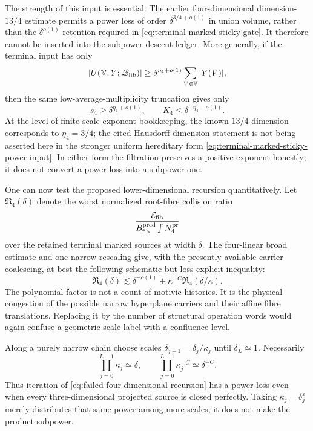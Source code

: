 \documentclass[11pt]{article}
\begin{document}
The strength of this input is essential.  The earlier four-dimensional
dimension-\(13/4\) estimate \cite{ChoudhuriSticky4D} permits a power loss
of order \(\delta^{3/4+o(1)}\) in union volume, rather than the
\(\delta^{o(1)}\) retention required in
\eqref{eq:terminal-marked-sticky-gate}.  It therefore cannot be inserted
into the subpower descent ledger.
More generally, if the terminal input has only
\begin{equation}\label{eq:terminal-marked-sticky-power-input}
 |U(\mathbb V,Y;\mathscr Q_{\rm fib})|
 \ge\delta^{\eta_4+o(1)}
       \sum_{V\in\mathbb V}|Y(V)|,
\end{equation}
then the same low-average-multiplicity truncation gives only
\begin{equation}\label{eq:terminal-marked-sticky-power-output}
 s_4\ge\delta^{\eta_4+o(1)},
 \qquad
 K_4\le\delta^{-\eta_4-o(1)}.
\end{equation}
At the level of finite-scale exponent bookkeeping, the known \(13/4\)
dimension corresponds to \(\eta_4=3/4\); the cited Hausdorff-dimension
statement is not being asserted here in the stronger uniform hereditary form
\eqref{eq:terminal-marked-sticky-power-input}.  In either form the
filtration preserves a positive exponent honestly; it does not convert a
power loss into a subpower one.

One can now test the proposed lower-dimensional recursion quantitatively.
Let \(\mathfrak R_4(\delta)\) denote the worst normalized root-fibre
collision ratio
\[
 \frac{\mathcal E_{\rm fib}}
      {B_{\rm fib}^{\rm pred}\int N_4^{\rm pr}}
\]
over the retained terminal marked sources at width \(\delta\).  The
four-linear broad estimate and one narrow rescaling give, with the presently
available carrier coalescing, at best the following schematic but
loss-explicit inequality:
\begin{equation}\label{eq:failed-four-dimensional-recursion}
 \mathfrak R_4(\delta)
 \lesssim \delta^{-o(1)}
 +\kappa^{-C}\mathfrak R_4(\delta/\kappa).
\end{equation}
The polynomial factor is not a count of motivic histories.  It is the physical
congestion of the possible narrow hyperplane carriers and their affine fibre
translations.  Replacing it by the number of structural operation words would
again confuse a geometric scale label with a confluence level.

Along a purely narrow chain choose scales
\(\delta_{j+1}=\delta_j/\kappa_j\) until
\(\delta_L\simeq1\).  Necessarily
\begin{equation}\label{eq:narrow-scale-product}
 \prod_{j=0}^{L-1}\kappa_j\simeq\delta,
 \qquad
 \prod_{j=0}^{L-1}\kappa_j^{-C}\simeq\delta^{-C}.
\end{equation}
Thus iteration of \eqref{eq:failed-four-dimensional-recursion} has a power
loss even when every three-dimensional projected source is closed perfectly.
Taking \(\kappa_j=\delta_j^{\varepsilon}\) merely distributes that
same power among more scales; it does not make the product subpower.
\end{document}
